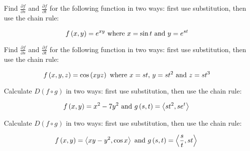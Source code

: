 \documentclass[12pt,letterpaper]{hmcpset}
\newcommand{\pn}[1]{\left( #1 \right)}
\newcommand{\vc}[1]{\left\langle #1 \right\rangle}
\begin{document}
\begin{problem}[2.b]

    Find $\frac{\partial f}{\partial s}$ and $\frac{\partial f}{\partial t}$ for the following function in two ways: first use substitution, then use the chain rule:

    \[
        f\pn{x,y} = e^{xy} \text{ where $x=\sin t$ and $y=e^{st}$}\\
    \]

\end{problem}

\begin{solution}
\end{solution}

\begin{problem}[2.c]

    Find $\frac{\partial f}{\partial s}$ and $\frac{\partial f}{\partial t}$ for the following function in two ways: first use substitution, then use the chain rule:

    \[
        f\pn{x,y,z} = \cos\pn{xyz} \text{ where $x=st$, $y=st^2$ and $z=st^3$}\\
    \]

\end{problem}

\begin{solution}
\end{solution}

\begin{problem}[3.a]

    Calculate $D\pn{f \circ g}$ in two ways: first use substitution, then use the chain rule:

    \[
        f\pn{x,y} = x^2 - 7y^2 \text{ and } g\pn{s,t} = \vc{st^2, se^t}\\
    \]

\end{problem}

\begin{solution}
\end{solution}

\begin{problem}[3.b]

    Calculate $D\pn{f \circ g}$ in two ways: first use substitution, then use the chain rule:

    \[
        f\pn{x,y} = \vc{xy-y^2, \cos x} \text{ and } g\pn{s,t} = \vc{\frac{s}{t}, st}\\
    \]

\end{problem}
\end{document}
